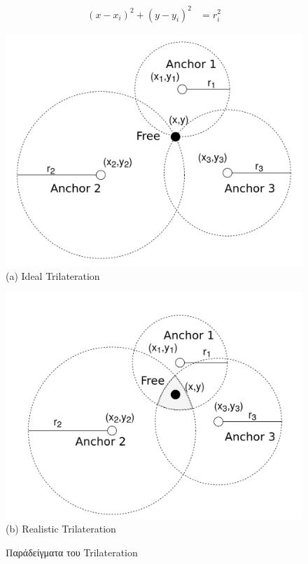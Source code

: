 \begin{align}
	(x-x_i)^2 + (y-y_i)^2 &= r_i^2 \label{eq:trilateration-circles}
\end{align}

\begin{figure} [H]
	\centering
		\begin{minipage}{.5\textwidth}
			\centering
			\includegraphics[width=0.7\linewidth]{../Photos/Trilateration-ideal.png}\\
			{(a) Ideal Trilateration}
		\end{minipage}%
		\begin{minipage}{.5\textwidth}
			\centering
			\includegraphics[width=.7\linewidth]{../Photos/Trilateration-actual.png}\\
			{(b) Realistic Trilateration}
		\end{minipage}
    \hfill \break
    \decoRule
    \caption[Παραδείγματα του Trilateration]{Παράδείγματα του Trilateration} %
    \label{fig:Trilateration-examples}
\end{figure}


